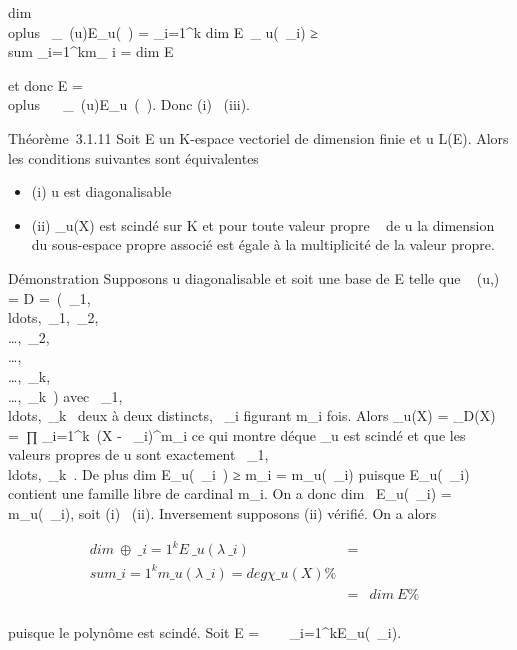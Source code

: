 \documentclass[]{article}
\begin{document}
dim~ \\oplus~
\_\lambda~\in{}(u)E\_u(\lambda~) =
\sum \_i=1^k dim E~\_
u(\lambda~\_i) ≥\\sum
\_i=1^km\_ i = dim E

et donc E = \\oplus~ ~
\_\lambda~\in{}(u)E\_u~(\lambda~).
Donc (i) \rigtharrow~(iii).

Théorème~3.1.11 Soit E un K-espace vectoriel de dimension finie et u \in
L(E). Alors les conditions suivantes sont équivalentes

\begin{itemize}
\itemsep1pt\parskip0pt
\item
  (i) u est diagonalisable
\item
  (ii) \chi\_u(X) est scindé sur K et pour toute valeur propre \lambda~ de
  u la dimension du sous-espace propre associé est égale à la
  multiplicité de la valeur propre.
\end{itemize}

Démonstration Supposons u diagonalisable et soit  une base de E telle
que \mathrmMat~ (u,) = D
=\
\mathrmdiag(\lambda~\_1,\\ldots,\lambda~\_1,\lambda~\_2,\\\ldots,\lambda~\_2,\\\ldots,\\\ldots,\lambda~\_k,\\\ldots,\lambda~\_k~)
avec
\lambda~\_1,\\ldots,\lambda~\_k~
deux à deux distincts, \lambda~\_i figurant m\_i fois. Alors
\chi\_u(X) = \chi\_D(X) =\
∏  \_i=1^k~(X -
\lambda~\_i)^m\_i ce qui montre dé que \chi\_u
est scindé et que les valeurs propres de u sont exactement
\lambda~\_1,\\ldots,\lambda~\_k~.
De plus dim E\_u(\lambda~\_i~) ≥
m\_i = m\_u(\lambda~\_i) puisque
E\_u(\lambda~\_i) contient une famille libre de cardinal
m\_i. On a donc dim~
E\_u(\lambda~\_i) = m\_u(\lambda~\_i), soit (i) \rigtharrow~(ii).
Inversement supposons (ii) vérifié. On a alors

\begin{align*} dim~
\oplus~ \_i=1^kE~\_
u(\lambda~\_i)& =& \\sum
\_i=1^km\_ u(\lambda~\_i) = deg
\chi\_u(X)\%& \\ & =&
dim~ E \%& \\
\end{align*}

puisque le polynôme est scindé. Soit E =\
\oplus~ ~
\_i=1^kE\_u(\lambda~\_i).
\end{document}
